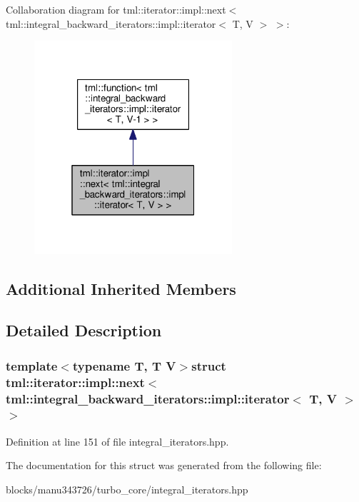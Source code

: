 Collaboration diagram for tml\+:\+:iterator\+:\+:impl\+:\+:next$<$ tml\+:\+:integral\+\_\+backward\+\_\+iterators\+:\+:impl\+:\+:iterator$<$ T, V $>$ $>$\+:
\nopagebreak
\begin{figure}[H]
\begin{center}
\leavevmode
\includegraphics[width=208pt]{structtml_1_1iterator_1_1impl_1_1next_3_01tml_1_1integral__backward__iterators_1_1impl_1_1iteratf7a3e0bdd18c2af9d2994c5a3723b4a6}
\end{center}
\end{figure}
\subsection*{Additional Inherited Members}


\subsection{Detailed Description}
\subsubsection*{template$<$typename T, T V$>$struct tml\+::iterator\+::impl\+::next$<$ tml\+::integral\+\_\+backward\+\_\+iterators\+::impl\+::iterator$<$ T, V $>$ $>$}



Definition at line 151 of file integral\+\_\+iterators.\+hpp.



The documentation for this struct was generated from the following file\+:\begin{DoxyCompactItemize}
\item 
blocks/manu343726/turbo\+\_\+core/integral\+\_\+iterators.\+hpp\end{DoxyCompactItemize}
